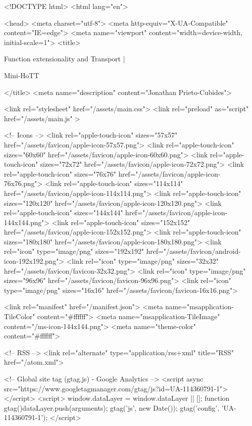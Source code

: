 <!DOCTYPE html>
<html lang="en">

<head>
  <meta charset="utf-8">
  <meta http-equiv="X-UA-Compatible" content="IE=edge">
  <meta name="viewport" content="width=device-width, initial-scale=1">
  <title>
    
      
        Function extensionality and Transport |
      
        Mini-HoTT
    
  </title>
  <meta name="description" content="Jonathan Prieto-Cubides">

  <link rel="stylesheet" href="/assets/main.css">
  <link rel="preload" as="script" href="/assets/main.js" >

  <!-- Icons -->
  <link rel="apple-touch-icon" sizes="57x57" href="/assets/favicon/apple-icon-57x57.png">
  <link rel="apple-touch-icon" sizes="60x60" href="/assets/favicon/apple-icon-60x60.png">
  <link rel="apple-touch-icon" sizes="72x72" href="/assets/favicon/apple-icon-72x72.png">
  <link rel="apple-touch-icon" sizes="76x76" href="/assets/favicon/apple-icon-76x76.png">
  <link rel="apple-touch-icon" sizes="114x114" href="/assets/favicon/apple-icon-114x114.png">
  <link rel="apple-touch-icon" sizes="120x120" href="/assets/favicon/apple-icon-120x120.png">
  <link rel="apple-touch-icon" sizes="144x144" href="/assets/favicon/apple-icon-144x144.png">
  <link rel="apple-touch-icon" sizes="152x152" href="/assets/favicon/apple-icon-152x152.png">
  <link rel="apple-touch-icon" sizes="180x180" href="/assets/favicon/apple-icon-180x180.png">
  <link rel="icon" type="image/png" sizes="192x192"  href="/assets/favicon/android-icon-192x192.png">
  <link rel="icon" type="image/png" sizes="32x32" href="/assets/favicon/favicon-32x32.png">
  <link rel="icon" type="image/png" sizes="96x96" href="/assets/favicon/favicon-96x96.png">
  <link rel="icon" type="image/png" sizes="16x16" href="/assets/favicon/favicon-16x16.png">

  <link rel="manifest" href="/manifest.json">
  <meta name="msapplication-TileColor" content="#ffffff">
  <meta name="msapplication-TileImage" content="/ms-icon-144x144.png">
  <meta name="theme-color" content="#ffffff">

  <!-- RSS -->
  <link rel="alternate" type="application/rss+xml" title="RSS" href="/atom.xml">

  <!-- Global site tag (gtag.js) - Google Analytics -->
  <script async src="https://www.googletagmanager.com/gtag/js?id=UA-114360791-1"></script>
  <script>
    window.dataLayer = window.dataLayer || [];
    function gtag(){dataLayer.push(arguments);}
    gtag('js', new Date());
    gtag('config', 'UA-114360791-1');
  </script>

